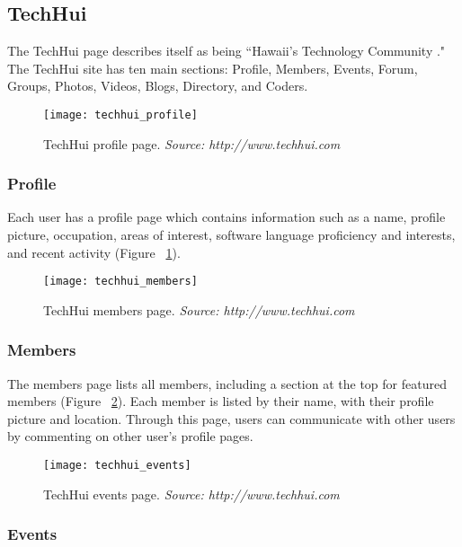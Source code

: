 \subsection{TechHui}

The TechHui page describes itself as being ``Hawaii's Technology Community  \cite{TechHui}." The TechHui site has ten main sections: Profile, Members, Events, Forum, Groups, Photos, Videos, Blogs, Directory, and Coders.

\begin{figure}[h]
\centering
\texttt{[image: techhui\_profile]}
\caption{TechHui profile page. \textit{Source: http://www.techhui.com}}
\label{techhui-profile}
\end{figure}

\subsubsection{Profile}

Each user has a profile page which contains information such as a name, profile picture, occupation, areas of interest, software language proficiency and interests, and recent activity (Figure ~\ref{techhui-profile}).

\begin{figure}[h]
\centering
\texttt{[image: techhui\_members]}
\caption{TechHui members page. \textit{Source: http://www.techhui.com}}
\label{techhui-members}
\end{figure}

\subsubsection{Members}

The members page lists all members, including a section at the top for featured members (Figure ~\ref{techhui-members}). Each member is listed by their name, with their profile picture and location. Through this page, users can communicate with other users by commenting on other user's profile pages.

\begin{figure}[h]
\centering
\texttt{[image: techhui\_events]}
\caption{TechHui events page. \textit{Source: http://www.techhui.com}}
\label{techhui-events}
\end{figure}

\subsubsection{Events}


